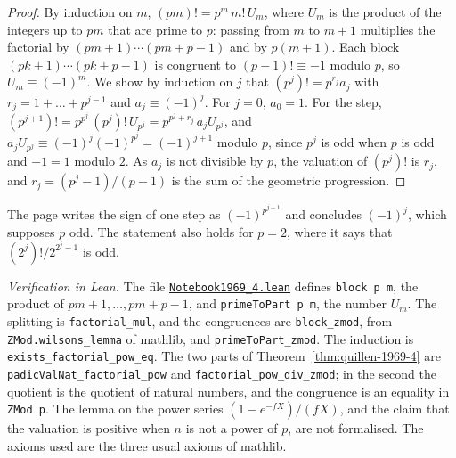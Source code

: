 \begin{proof}
By induction on $m$, $(pm)! = p^m\,m!\,U_m$, where $U_m$ is the product of the integers up to $pm$ that are prime to $p$: passing from $m$ to $m + 1$ multiplies the factorial by $(pm + 1)\cdots(pm + p - 1)$ and by $p(m + 1)$. Each block $(pk + 1)\cdots(pk + p - 1)$ is congruent to $(p - 1)! \equiv -1$ modulo $p$, so $U_m \equiv (-1)^m$. We show by induction on $j$ that $(p^j)! = p^{r_j} a_j$ with $r_j = 1 + \dots + p^{j-1}$ and $a_j \equiv (-1)^j$. For $j = 0$, $a_0 = 1$. For the step, $(p^{j+1})! = p^{p^j}\,(p^j)!\,U_{p^j} = p^{p^j + r_j}\,a_j U_{p^j}$, and $a_jU_{p^j} \equiv (-1)^j(-1)^{p^j} = (-1)^{j+1}$ modulo $p$, since $p^j$ is odd when $p$ is odd and $-1 = 1$ modulo $2$. As $a_j$ is not divisible by $p$, the valuation of $(p^j)!$ is $r_j$, and $r_j = (p^j - 1)/(p - 1)$ is the sum of the geometric progression.
\end{proof}

\noindent The page writes the sign of one step as $(-1)^{p^{j-1}}$ and concludes $(-1)^j$, which supposes $p$ odd. The statement also holds for $p = 2$, where it says that $(2^j)!/2^{2^j - 1}$ is odd.

\emph{Verification in Lean.} The file \href{\leanblobmain/Notebook1969_4.lean}{\texttt{Notebook1969\_4.\allowbreak{}lean}} defines \texttt{block p m}, the product of $pm + 1, \dots, pm + p - 1$, and \texttt{primeToPart p m}, the number $U_m$. The splitting is \texttt{factorial\_mul}, and the congruences are \texttt{block\_zmod}, from \texttt{ZMod.wilsons\_lemma} of mathlib, and \texttt{primeToPart\_zmod}. The induction is \texttt{exists\_factorial\_pow\_eq}. The two parts of Theorem~\ref{thm:quillen-1969-4} are \texttt{padicValNat\_factorial\_pow} and \texttt{factorial\_pow\_div\_zmod}; in the second the quotient is the quotient of natural numbers, and the congruence is an equality in \texttt{ZMod p}. The lemma on the power series $(1 - e^{-fX})/(fX)$, and the claim that the valuation is positive when $n$ is not a power of $p$, are not formalised. The axioms used are the three usual axioms of mathlib.

